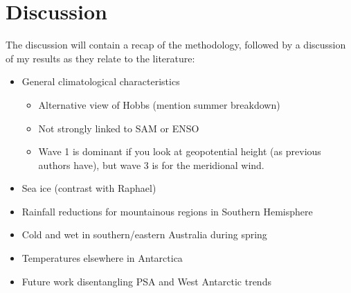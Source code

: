\section{Discussion}

The discussion will contain a recap of the methodology, followed by a discussion of my results as they relate to the literature:
\begin{itemize}
\item General climatological characteristics
\begin{itemize}
\item Alternative view of Hobbs (mention summer breakdown)
\item Not strongly linked to SAM or ENSO
\item Wave 1 is dominant if you look at geopotential height (as previous authors have), but wave 3 is for the meridional wind.
\end{itemize}
\item Sea ice (contrast with Raphael)
\item Rainfall reductions for mountainous regions in Southern Hemisphere
\item Cold and wet in southern/eastern Australia during spring
\item Temperatures elsewhere in Antarctica
\item Future work disentangling PSA and West Antarctic trends
\end{itemize}